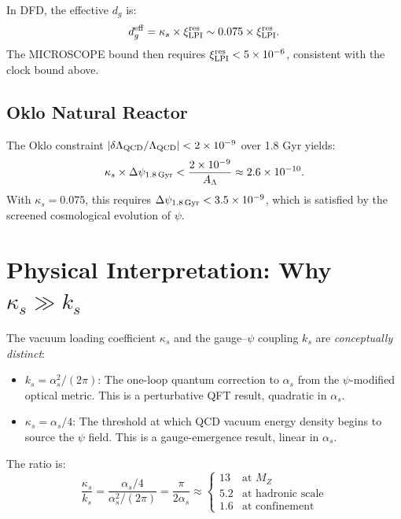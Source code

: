 \documentclass[11pt,letterpaper]{article}
\theoremstyle{definition}
\begin{document}
In DFD, the effective $d_g$ is:
\begin{equation}
d_g^{\rm eff} = \kappa_s \times \xi_{\rm LPI}^{\rm res}
\sim 0.075 \times \xi_{\rm LPI}^{\rm res}.
\end{equation}
The MICROSCOPE bound then requires $\xi_{\rm LPI}^{\rm res} <
5 \times 10^{-6}$, consistent with the clock bound above.

\subsection{Oklo Natural Reactor}

The Oklo constraint $|\delta\Lambda_{\rm QCD}/\Lambda_{\rm QCD}|
< 2 \times 10^{-9}$ over 1.8 Gyr yields:
\begin{equation}
\kappa_s \times \Delta\psi_{\rm 1.8\,Gyr} <
\frac{2 \times 10^{-9}}{A_\Lambda} \approx 2.6 \times 10^{-10}.
\end{equation}
With $\kappa_s = 0.075$, this requires
$\Delta\psi_{\rm 1.8\,Gyr} < 3.5 \times 10^{-9}$, which is
satisfied by the screened cosmological evolution of $\psi$.

\section{Physical Interpretation: Why $\kappa_s \gg k_s$}
\label{sec:interpretation}

The vacuum loading coefficient $\kappa_s$ and the gauge--$\psi$
coupling $k_s$ are \emph{conceptually distinct}:

\begin{itemize}
\item \textbf{$k_s = \alpha_s^2/(2\pi)$}: The one-loop quantum
correction to $\alpha_s$ from the $\psi$-modified optical metric.
This is a perturbative QFT result, quadratic in $\alpha_s$.

\item \textbf{$\kappa_s = \alpha_s/4$}: The threshold at which
QCD vacuum energy density begins to source the $\psi$ field.
This is a gauge-emergence result, linear in $\alpha_s$.
\end{itemize}

The ratio is:
\begin{equation}
\frac{\kappa_s}{k_s} = \frac{\alpha_s/4}{\alpha_s^2/(2\pi)}
= \frac{\pi}{2\alpha_s} \approx
\begin{cases}
13 & \text{at } M_Z \\
5.2 & \text{at hadronic scale} \\
1.6 & \text{at confinement}
\end{cases}
\end{equation}
\end{document}
